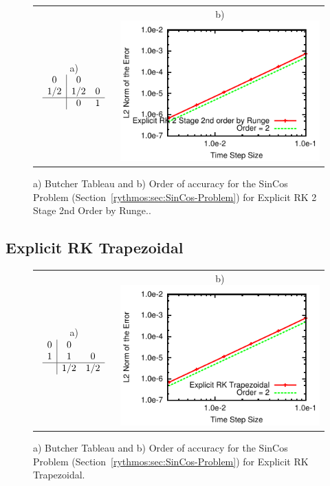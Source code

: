 \begin{figure}[H]
\centering{}%
\begin{tabular}{cc}
a) $\begin{array}{c|cc}
0 & 0\\
1/2 & 1/2 & 0\\
\hline  & 0 & 1
\end{array}$ & b)\includegraphics[scale=1.5]{figures/ERK_2Stage2OrderRunge}\tabularnewline
\end{tabular}\caption{a) Butcher Tableau and b) Order of accuracy for the SinCos Problem
(Section~\ref{rythmos:sec:SinCos-Problem}) for Explicit RK 2 Stage
2nd Order by Runge.\label{rythmos:tab:ButcherTableau-ERK_2Stage2OrderRunge}.}
\end{figure}



\subsection{Explicit RK Trapezoidal}

\begin{figure}[H]
\centering{}%
\begin{tabular}{cc}
a) $\begin{array}{c|cc}
0 & 0\\
1 & 1 & 0\\
\hline  & 1/2 & 1/2
\end{array}$ & b)\includegraphics[scale=1.5]{figures/ERK_Trapezoidal}\tabularnewline
\end{tabular}\caption{a) Butcher Tableau and b) Order of accuracy for the SinCos Problem
(Section~\ref{rythmos:sec:SinCos-Problem}) for Explicit RK Trapezoidal.\label{rythmos:tab:ButcherTableau-ERK_Trapezoidal}}
\end{figure}



